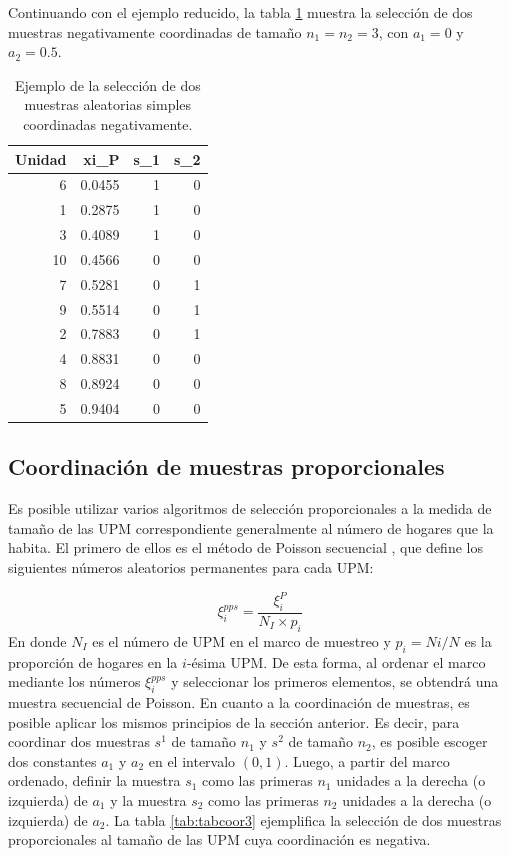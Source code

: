 \documentclass[
  12pt,
]{book}
\begin{document}
Continuando con el ejemplo reducido, la tabla \ref{tab:tabcoor2} muestra la selección de dos muestras negativamente coordinadas de tamaño \(n_1 = n_2 =3\), con \(a_1 = 0\) y \(a_2 = 0.5\).

\begin{table}

\caption{\label{tab:tabcoor2}Ejemplo de la selección de dos muestras aleatorias simples coordinadas negativamente.}
\centering
\begin{tabular}[t]{r|r|r|r}
\hline
Unidad & xi\_P & s\_1 & s\_2\\
\hline
6 & 0.0455 & 1 & 0\\
\hline
1 & 0.2875 & 1 & 0\\
\hline
3 & 0.4089 & 1 & 0\\
\hline
10 & 0.4566 & 0 & 0\\
\hline
7 & 0.5281 & 0 & 1\\
\hline
9 & 0.5514 & 0 & 1\\
\hline
2 & 0.7883 & 0 & 1\\
\hline
4 & 0.8831 & 0 & 0\\
\hline
8 & 0.8924 & 0 & 0\\
\hline
5 & 0.9404 & 0 & 0\\
\hline
\end{tabular}
\end{table}

\hypertarget{coordinaciuxf3n-de-muestras-proporcionales}{%
\subsection{Coordinación de muestras proporcionales}\label{coordinaciuxf3n-de-muestras-proporcionales}}

Es posible utilizar varios algoritmos de selección proporcionales a la medida de tamaño de las UPM correspondiente generalmente al número de hogares que la habita. El primero de ellos es el método de Poisson secuencial \citep{Ohl95}, que define los siguientes números aleatorios permanentes para cada UPM:

\[
\xi_i^{pps} = \frac{\xi_i^P}{N_I \times p_i}
\]
En donde \(N_I\) es el número de UPM en el marco de muestreo y \(p_i = Ni/N\) es la proporción de hogares en la \(i\)-ésima UPM. De esta forma, al ordenar el marco mediante los números \(\xi_i^{pps}\) y seleccionar los primeros elementos, se obtendrá una muestra secuencial de Poisson. En cuanto a la coordinación de muestras, es posible aplicar los mismos principios de la sección anterior. Es decir, para coordinar dos muestras \(s^1\) de tamaño \(n_1\) y \(s^2\) de tamaño \(n_2\), es posible escoger dos constantes \(a_1\) y \(a_2\) en el intervalo \((0, 1)\). Luego, a partir del marco ordenado, definir la muestra \(s_1\) como las primeras \(n_1\) unidades a la derecha (o izquierda) de \(a_1\) y la muestra \(s_2\) como las primeras \(n_2\) unidades a la derecha (o izquierda) de \(a_2\). La tabla \ref{tab:tabcoor3} ejemplifica la selección de dos muestras proporcionales al tamaño de las UPM cuya coordinación es negativa.
\end{document}

